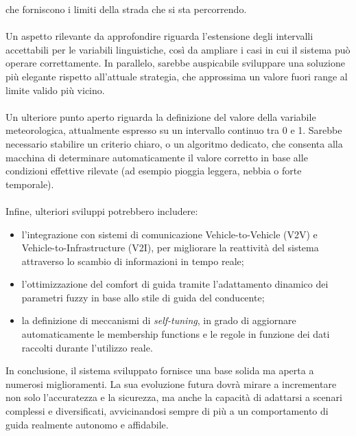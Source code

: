 che forniscono i limiti della strada che si sta percorrendo.
\\\\
\noindent Un aspetto rilevante da approfondire riguarda l'estensione degli intervalli accettabili per le variabili linguistiche, 
così da ampliare i casi in cui il sistema può operare correttamente.  
In parallelo, sarebbe auspicabile sviluppare una soluzione più elegante rispetto all'attuale strategia, 
che approssima un valore fuori range al limite valido più vicino.
\\\\
\noindent Un ulteriore punto aperto riguarda la definizione del valore della variabile meteorologica, 
attualmente espresso su un intervallo continuo tra 0 e 1.  
Sarebbe necessario stabilire un criterio chiaro, o un algoritmo dedicato, che consenta alla macchina di 
determinare automaticamente il valore corretto in base alle condizioni effettive rilevate 
(ad esempio pioggia leggera, nebbia o forte temporale).
\\\\
\noindent Infine, ulteriori sviluppi potrebbero includere:
\begin{itemize}
    \item l'integrazione con sistemi di comunicazione Vehicle-to-Vehicle (V2V) e Vehicle-to-Infrastructure (V2I), 
    per migliorare la reattività del sistema attraverso lo scambio di informazioni in tempo reale;
    \item l'ottimizzazione del comfort di guida tramite l'adattamento dinamico dei parametri fuzzy 
    in base allo stile di guida del conducente;
    \item la definizione di meccanismi di \textit{self-tuning}, in grado di aggiornare automaticamente 
    le membership functions e le regole in funzione dei dati raccolti durante l'utilizzo reale.
\end{itemize}

\noindent In conclusione, il sistema sviluppato fornisce una base solida ma aperta a numerosi miglioramenti.  
La sua evoluzione futura dovrà mirare a incrementare non solo l'accuratezza e la sicurezza, 
ma anche la capacità di adattarsi a scenari complessi e diversificati, avvicinandosi sempre di più 
a un comportamento di guida realmente autonomo e affidabile.  
